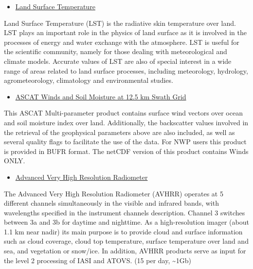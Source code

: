 \documentclass[11pt]{article}
\begin{document}
\begin{itemize}
\item \href{http://navigator.eumetsat.int/discovery/Start/DirectSearch/Extended.do?freeTextValue%2528resourceidentifier%2529=EO:EUM:DAT:MSG:LST-SEVIRI}{Land Surface Temperature}
\end{itemize}

Land Surface Temperature (LST) is the radiative skin temperature
over land. LST plays an important role in the physics of land
surface as it is involved in the processes of energy and water
exchange with the atmosphere. LST is useful for the scientific
community, namely for those dealing with meteorological and
climate models. Accurate values of LST are also of special
interest in a wide range of areas related to land surface
processes, including meteorology, hydrology, agrometeorology,
climatology and environmental studies.

\begin{itemize}
\item \href{http://navigator.eumetsat.int/discovery/Start/DirectSearch/Extended.do?freeTextValue%2528resourceidentifier%2529=EO:EUM:DAT:METOP:OAS012}{ASCAT Winds and Soil Moisture at 12.5 km Swath Grid}
\end{itemize}

This ASCAT Multi-parameter product contains surface wind vectors
over ocean and soil moisture index over land. Additionally, the
backscatter values involved in the retrieval of the geophysical
parameters above are also included, as well as several quality
flags to facilitate the use of the data. For NWP users this
product is provided in BUFR format. The netCDF version of this
product contains Winds ONLY.

\begin{itemize}
\item \href{http://navigator.eumetsat.int/discovery/Query/Detail.do?fileIdentifier=EO%253AEUM%253ADAT%253AMETOP%253AAVHRRL1&pageId=brief_BROWSER_QUERY_FRAME&history=catalogHistory}{Advanced Very High Resolution Radiometer}
\end{itemize}

The Advanced Very High Resolution Radiometer (AVHRR) operates at 5
different channels simultaneously in the visible and infrared
bands, with wavelengths specified in the instrument channels
description. Channel 3 switches between 3a and 3b for daytime and
nighttime. As a high-resolution imager (about 1.1 km near nadir)
its main purpose is to provide cloud and surface information such
as cloud coverage, cloud top temperature, surface temperature over
land and sea, and vegetation or snow/ice. In addition, AVHRR
products serve as input for the level 2 processing of IASI and
ATOVS. (15 per day, \textasciitilde{}1Gb)
\end{document}
